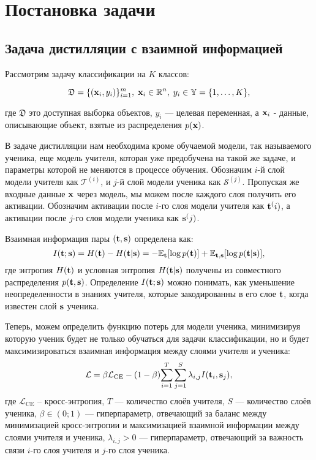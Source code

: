 \section{Постановка задачи}

\subsection{Задача дистилляции с взаимной информацией}

Рассмотрим задачу классификации на $K$ классов:

$$\mathfrak{D}  = \{(\bold{x}_i, y_i)\}_{i=1}^{m},\; \bold{x}_i \in \mathbb{R}^n,\; y_i \in \mathbb{Y}  = \{1, \dots, K\},$$

где $\mathfrak{D}$ это доступная выборка объектов, $y_i$ --- целевая переменная, а $\bold{x}_i$ - данные, описывающие объект, взятые из распределения $p(\bold{x})$.

В задаче дистилляции нам необходима кроме обучаемой модели, так называемого ученика, еще модель учителя,
которая уже предобучена на такой же задаче, и параметры которой не меняются в процессе обучения.
Обозначим $i$-й слой модели учителя как $\mathcal{T}^{(i)}$, и $j$-й слой модели ученика как $\mathcal{S}^{(j)}$. Пропуская же входные данные $\bold{x}$ через модель,
мы можем после каждого слоя получить его активации.
Обозначим активации после $i$-го слоя модели учителя как $\bold{t}^(i)$, а активации после $j$-го слоя модели ученика как $\bold{s}^(j)$.

Взаимная информация пары $(\bold{t}, \bold{s})$ определена как:
$$ I(\bold{t}; \bold{s}) = H(\bold{t}) - H(\bold{t} | \bold{s}) =  -\mathbb{E}_{\bold{t}}[\log{p(\bold{t})}] + \mathbb{E}_{\bold{t},\bold{s}}[\log{p(\bold{t}|\bold{s})}],$$
где энтропия $H(\bold{t})$ и условная энтропия $H(\bold{t}|\bold{s})$ получены из совместного распределения $p(\bold{t},\bold{s})$.
Определение $I(\bold{t}; \bold{s})$ можно понимать, как уменьшение неопределенности в знаниях учителя, которые закодированны в его слое $\bold{t}$,
когда известен слой $\bold{s}$ ученика.

Теперь, можем определить функцию потерь для модели ученика, минимизируя которую ученик будет не только обучаться для задачи классификации,
но и будет максимизироваться взаимная информация между слоями учителя и ученика:
$$\mathcal{L} = \beta \mathcal{L}_\text{CE} - (1 - \beta){\sum_{i=1}^T \sum_{j=1}^S \lambda_{i, j}I(\bold{t}_{i}, \bold{s}_{j})},$$
где $\mathcal{L}_\text{CE}$ -- кросс-энтропия, $T$ --- количество слоёв учителя, $S$ --- количество слоёв ученика, $\beta \in (0;1)$ --- гиперпараметр,
отвечающий за баланс между минимизацией кросс-энтропии и максимизацией взаимной информации между слоями учителя и ученика, $\lambda_{i, j} > 0$ ---
гиперпараметр, отвечающий за важность связи $i$-го слоя учителя и $j$-го слоя ученика.

